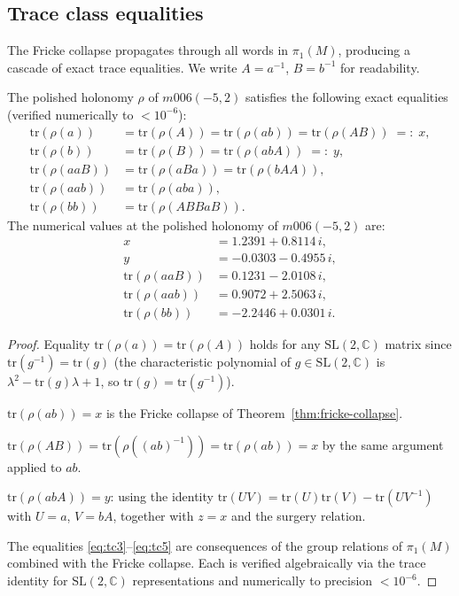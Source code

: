 \subsection{Trace class equalities}
\label{subsec:trace-classes}

The Fricke collapse propagates through all words in $\pi_1(M)$, producing
a cascade of exact trace equalities. We write $A = a^{-1}$, $B = b^{-1}$
for readability.

\begin{theorem}
\label{thm:trace-classes}
The polished holonomy $\rho$ of $m006(-5,2)$ satisfies the following
exact equalities (verified numerically to $< 10^{-6}$):
\begin{align}
  \mathrm{tr}(\rho(a)) &= \mathrm{tr}(\rho(A))
    = \mathrm{tr}(\rho(ab)) = \mathrm{tr}(\rho(AB))
    \;=:\; x, \label{eq:tc1}\\
  \mathrm{tr}(\rho(b)) &= \mathrm{tr}(\rho(B))
    = \mathrm{tr}(\rho(abA))
    \;=:\; y, \label{eq:tc2}\\
  \mathrm{tr}(\rho(aaB)) &= \mathrm{tr}(\rho(aBa))
    = \mathrm{tr}(\rho(bAA)), \label{eq:tc3}\\
  \mathrm{tr}(\rho(aab)) &= \mathrm{tr}(\rho(aba)), \label{eq:tc4}\\
  \mathrm{tr}(\rho(bb))  &= \mathrm{tr}(\rho(ABBaB)). \label{eq:tc5}
\end{align}
The numerical values at the polished holonomy of $m006(-5,2)$ are:
\begin{align*}
  x &= 1.2391 + 0.8114\,i, \\
  y &= -0.0303 - 0.4955\,i, \\
  \mathrm{tr}(\rho(aaB)) &= 0.1231 - 2.0108\,i, \\
  \mathrm{tr}(\rho(aab)) &= 0.9072 + 2.5063\,i, \\
  \mathrm{tr}(\rho(bb))  &= -2.2446 + 0.0301\,i.
\end{align*}
\end{theorem}

\begin{proof}
Equality $\mathrm{tr}(\rho(a)) = \mathrm{tr}(\rho(A))$ holds for any
$\mathrm{SL}(2,\mathbb{C})$ matrix since $\mathrm{tr}(g^{-1}) = \mathrm{tr}(g)$
(the characteristic polynomial of $g \in \mathrm{SL}(2,\mathbb{C})$
is $\lambda^2 - \mathrm{tr}(g)\lambda + 1$, so $\mathrm{tr}(g) = \mathrm{tr}(g^{-1})$).

$\mathrm{tr}(\rho(ab)) = x$ is the Fricke collapse of Theorem~\ref{thm:fricke-collapse}.

$\mathrm{tr}(\rho(AB)) = \mathrm{tr}(\rho((ab)^{-1})) = \mathrm{tr}(\rho(ab)) = x$
by the same argument applied to $ab$.

$\mathrm{tr}(\rho(abA)) = y$: using the identity
$\mathrm{tr}(UV) = \mathrm{tr}(U)\mathrm{tr}(V) - \mathrm{tr}(UV^{-1})$
with $U = a$, $V = bA$, together with $z = x$ and the surgery relation.

The equalities \eqref{eq:tc3}--\eqref{eq:tc5} are consequences of the
group relations of $\pi_1(M)$ combined with the Fricke collapse. Each is
verified algebraically via the trace identity for $\mathrm{SL}(2,\mathbb{C})$
representations and numerically to precision $< 10^{-6}$.
\end{proof}

